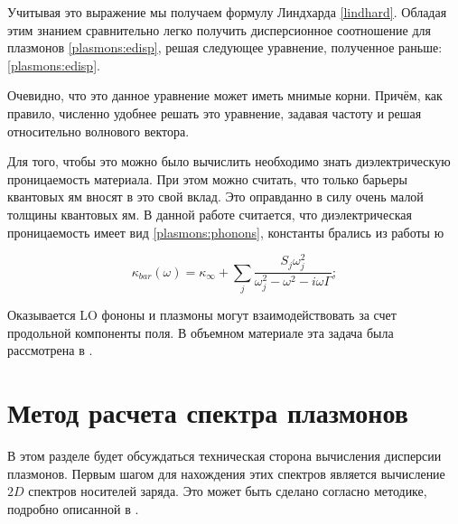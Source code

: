 \documentclass[../main.tex]{subfiles}
\begin{document}
    Учитывая это выражение мы получаем формулу Линдхарда \ref{lindhard}. Обладая 
    этим знанием сравнительно легко получить дисперсионное соотношение для плазмонов
    \ref{plasmons:edisp}, решая следующее уравнение, полученное раньше: \ref{plasmons:edisp}.

    
    Очевидно, что это данное уравнение может иметь мнимые корни. Причём, как правило,
    численно удобнее решать это уравнение, задавая частоту и решая относительно 
    волнового вектора.



    Для того, чтобы это можно было вычислить необходимо знать диэлектрическую 
    проницаемость материала. При этом можно считать, что только барьеры 
    квантовых ям вносят в это свой вклад. Это оправданно в силу очень малой
    толщины квантовых ям. В данной работе считается, что диэлектрическая 
    проницаемость имеет вид \ref{plasmons:phonons}, константы брались
    из работы \cite{palik1998handbook}ю

    \begin{equation}
        \label{plasmons:phonons}
        \kappa_{bar}(\omega) = \kappa_\infty + \sum_{j} \frac{S_j \omega_j^2}
                                    {\omega_j^2 - \omega^2 - i \omega \Gamma};
    \end{equation}

    Оказывается LO фононы и плазмоны могут взаимодействовать за счет продольной компоненты поля.
    В объемном материале эта задача была рассмотрена в \cite{peter2002manuel}. 

    \section{Метод расчета спектра плазмонов}


    В этом разделе будет обсуждаться техническая сторона вычисления дисперсии плазмонов.
    Первым шагом для нахождения этих спектров является вычисление $2D$ спектров носителей заряда. 
    Это может быть сделано согласно методике, подробно описанной в \cite{HgCdTeCalcZholudev}.
    
\end{document}
